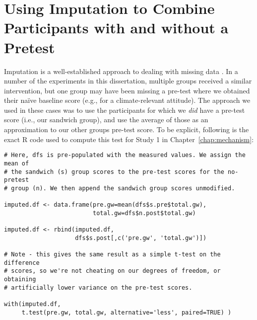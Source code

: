 \chapter{Using Imputation to Combine Participants with and without a Pretest}
\label{app:imputation}

Imputation is a well-established approach to dealing with missing data
\parencite[for an overview see][Chapter 20]{fox_applied_2008}. In a number of
the experiments in this dissertation, multiple groups received a similar
intervention, but one group may have been missing a pre-test where we obtained
their na\"ive baseline score (e.g., for a climate-relevant attitude). The
approach we used in these cases was to use the participants for which we
\emph{did} have a pre-test score (i.e., our sandwich group), and use the average
of those as an approximation to our other groups pre-test score. To be explicit,
following is the exact R code used to compute this test for Study 1 in
Chapter~\ref{chap:mechanism}:

\begin{verbatim}
# Here, dfs is pre-populated with the measured values. We assign the mean of
# the sandwich (s) group scores to the pre-test scores for the no-pretest
# group (n). We then append the sandwich group scores unmodified.

imputed.df <- data.frame(pre.gw=mean(dfs$s.pre$total.gw),
                         total.gw=dfs$n.post$total.gw)

imputed.df <- rbind(imputed.df,
                    dfs$s.post[,c('pre.gw', 'total.gw')])

# Note - this gives the same result as a simple t-test on the difference
# scores, so we're not cheating on our degrees of freedom, or obtaining
# artificially lower variance on the pre-test scores.

with(imputed.df,
     t.test(pre.gw, total.gw, alternative='less', paired=TRUE) )
\end{verbatim}
